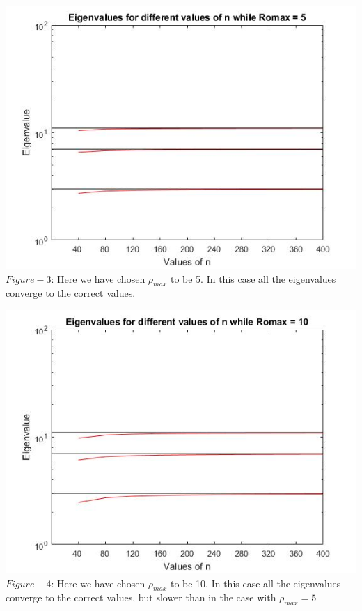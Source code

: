 \documentclass[10pt,a4paper]{article}
\begin{document}
\begin{center}
\includegraphics[scale=0.55]{rho5.jpg}
$Figure-3$: Here we have chosen ${\rho}_{max}$ to be 5. In this case all the eigenvalues converge to the correct values. 

\includegraphics[scale=0.6]{rho10.jpg}
$Figure-4$: Here we have chosen ${\rho}_{max}$ to be 10. In this case all the eigenvalues converge to the correct values, but slower than in the case with ${\rho}_{max}=5$
\end{center}
\end{document}
